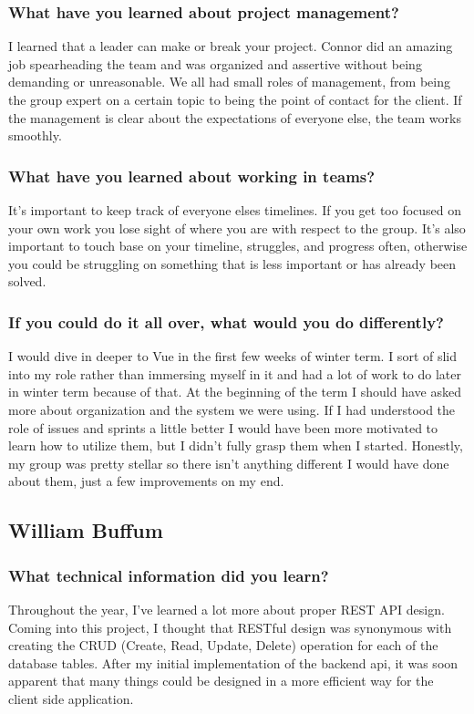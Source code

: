 \documentclass[draftclsnofoot,onecolumn,letterpaper,10pt]{IEEEtran}
\begin{document}
		\subsubsection{What have you learned about project management?}
		I learned that a leader can make or break your project.
		Connor did an amazing job spearheading the team and was organized and assertive without being demanding or unreasonable.
		We all had small roles of management, from being the group expert on a certain topic to being the point of contact for the client.
		If the management is clear about the expectations of everyone else, the team works smoothly.
		\subsubsection{What have you learned about working in teams?}
		It's important to keep track of everyone elses timelines.
		If you get too focused on your own work you lose sight of where you are with respect to the group.
		It's also important to touch base on your timeline, struggles, and progress often, otherwise you could be struggling on something that is less important or has already been solved.
		\subsubsection{If you could do it all over, what would you do differently?}
		I would dive in deeper to Vue in the first few weeks of winter term.
		I sort of slid into my role rather than immersing myself in it and had a lot of work to do later in winter term because of that.
		At the beginning of the term I should have asked more about organization and the system we were using.
		If I had understood the role of issues and sprints a little better I would have been more motivated to learn how to utilize them, but I didn't fully grasp them when I started.
		Honestly, my group was pretty stellar so there isn't anything different I would have done about them, just a few improvements on my end.

	\subsection{William Buffum}
		\subsubsection{What technical information did you learn?}
		Throughout the year, I've learned a lot more about proper REST API design.
		Coming into this project, I thought that RESTful design was synonymous with creating the CRUD (Create, Read, Update, Delete) operation for each of the database tables.
		After my initial implementation of the backend api, it was soon apparent that many things could be designed in a more efficient way for the client side application.
\end{document}

